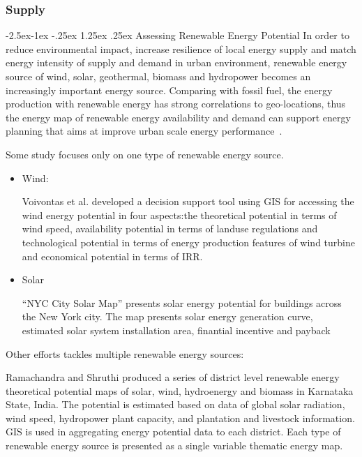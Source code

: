 \documentclass[hidelinks,12pt]{article}
\makeatletter
\renewcommand\paragraph{\@startsection{paragraph}{4}{\z@}%
            {-2.5ex\@plus -1ex \@minus -.25ex}%
            {1.25ex \@plus .25ex}%
            {\normalfont\normalsize\bfseries}}
\makeatother
\begin{document}
\subsubsection{Supply}
\paragraph{Assessing Renewable Energy Potential}
In order to reduce environmental impact, increase resilience of local
energy supply and match energy intensity of supply and demand in urban
environment, renewable energy source of wind, solar, geothermal,
biomass and hydropower becomes an increasingly important energy
source. Comparing with fossil fuel, the energy production with
renewable energy has strong correlations to geo-locations, thus the
energy map of renewable energy availability and demand can support
energy planning that aims at improve urban scale energy
performance~\cite{Ramachandra20071460}.

Some study focuses only on one type of renewable energy source.
\begin{itemize}
\item Wind: 

Voivontas et al. developed a decision support tool using GIS for
accessing the wind energy potential in four aspects:the theoretical
potential in terms of wind speed, availability potential in terms of
landuse regulations and technological potential in terms of energy
production features of wind turbine and economical potential in terms
of IRR. 
\item Solar

``NYC City Solar Map'' presents solar energy potential for
buildings across the New York city. The map presents solar energy
generation curve, estimated solar system installation area, finantial
incentive and payback~\cite{NYCSolarMap}
\end{itemize}

Other efforts tackles multiple renewable energy sources:

Ramachandra and Shruthi produced a series of district level renewable
energy theoretical potential maps of solar, wind, hydroenergy and
biomass in Karnataka State, India. The potential is estimated based on
data of global solar radiation, wind speed, hydropower plant capacity,
and plantation and livestock information. GIS is used in aggregating
energy potential data to each district. Each type of renewable energy
source is presented as a single variable thematic energy map.
\end{document}
